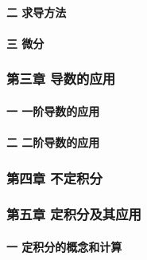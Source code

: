 \documentclass[
]{article}
\begin{document}
\hypertarget{ux4e8c--ux6c42ux5bfcux65b9ux6cd5}{%
\paragraph{二 求导方法}\label{ux4e8c--ux6c42ux5bfcux65b9ux6cd5}}

\hypertarget{ux4e09--ux5faeux5206}{%
\paragraph{三 微分}\label{ux4e09--ux5faeux5206}}

\hypertarget{ux7b2cux4e09ux7ae0--ux5bfcux6570ux7684ux5e94ux7528}{%
\subsubsection{第三章
导数的应用}\label{ux7b2cux4e09ux7ae0--ux5bfcux6570ux7684ux5e94ux7528}}

\hypertarget{ux4e00--ux4e00ux9636ux5bfcux6570ux7684ux5e94ux7528}{%
\paragraph{一
一阶导数的应用}\label{ux4e00--ux4e00ux9636ux5bfcux6570ux7684ux5e94ux7528}}

\hypertarget{ux4e8c--ux4e8cux9636ux5bfcux6570ux7684ux5e94ux7528}{%
\paragraph{二
二阶导数的应用}\label{ux4e8c--ux4e8cux9636ux5bfcux6570ux7684ux5e94ux7528}}

\hypertarget{ux7b2cux56dbux7ae0--ux4e0dux5b9aux79efux5206}{%
\subsubsection{第四章
不定积分}\label{ux7b2cux56dbux7ae0--ux4e0dux5b9aux79efux5206}}

\hypertarget{ux7b2cux4e94ux7ae0--ux5b9aux79efux5206ux53caux5176ux5e94ux7528}{%
\subsubsection{第五章
定积分及其应用}\label{ux7b2cux4e94ux7ae0--ux5b9aux79efux5206ux53caux5176ux5e94ux7528}}

\hypertarget{ux4e00--ux5b9aux79efux5206ux7684ux6982ux5ff5ux548cux8ba1ux7b97}{%
\paragraph{一
定积分的概念和计算}\label{ux4e00--ux5b9aux79efux5206ux7684ux6982ux5ff5ux548cux8ba1ux7b97}}
\end{document}
